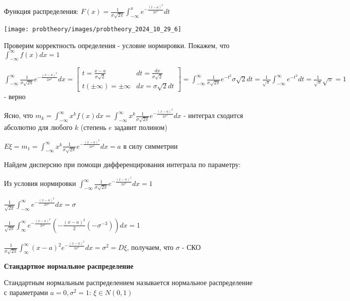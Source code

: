 \documentclass[12pt]{article}
\begin{document}
    Функция распределения: $F(x) = \frac{1}{\sigma \sqrt{2\pi}} \int_{-\infty}^x e^{-\frac{(t - a)^2}{2\sigma^2}} dt$

    \texttt{[image: probtheory/images/probtheory\_2024\_10\_29\_6]}

    Проверим корректность определения - условие нормировки. Покажем, что $\int_{-\infty}^\infty f(x)dx = 1$

    $\int_{-\infty}^\infty \frac{1}{\sigma \sqrt{2\pi}} e^{-\frac{(x - a)^2}{2\sigma^2}} dx = \left[\begin{matrix}t = \frac{x - a}{\sigma \sqrt{2}} & dt = \frac{dx}{\sigma\sqrt{2}} \\ t (\pm \infty) = \pm \infty & dx = \sigma\sqrt{2}dt\end{matrix}\right] = 
    \int_{-\infty}^\infty \frac{1}{\sigma\sqrt{2\pi}} e^{-t^2} \sigma\sqrt{2} dt = \frac{1}{\sqrt{\pi}} \int_{-\infty}^{\infty} e^{-t^2} dt = \frac{1}{\sqrt{\pi}} \sqrt{\pi} = 1$ - верно

    Ясно, что $m_k = \int_{-\infty}^\infty x^k f(x) dx = \int_{-\infty}^\infty x^k \frac{1}{\sigma \sqrt{2\pi}} e^{-\frac{(x - a)^2}{2\sigma^2}} dx$ - интеграл сходится абсолютно для любого $k$ (степень $e$ задавит полином)

    $E\xi = m_1 = \int_{-\infty}^\infty x^k \frac{1}{\sigma \sqrt{2\pi}} e^{-\frac{(x - a)^2}{2\sigma^2}} dx = a$ в силу симметрии

    Найдем дисперсию при помощи дифференцирования интеграла по параметру: 
    
    Из условия нормировки $\int_{-\infty}^\infty \frac{1}{\sigma \sqrt{2\pi}} e^{-\frac{(x - a)^2}{2\sigma^2}} dx = 1$

    $\frac{1}{\sqrt{2\pi}} \int_{-\infty}^\infty e^{-\frac{(x - a)^2}{2\sigma^2}} dx = \sigma$
    
    $\frac{1}{\sqrt{2\pi}} \int_{\infty}^\infty e^{-\frac{(x - a)^2}{2\sigma^2}} \left(-\frac{(x - a)^2}{2} (-\sigma^{-3})\right) dx = 1$
    
    $\frac{1}{\sigma\sqrt{2\pi}} \int_{\infty}^\infty (x - a)^2 e^{-\frac{(x - a)^2}{2\sigma^2}} dx = \sigma^2 = D\xi$, получаем, что $\sigma$ - СКО

    \mediumvspace

    \hypertarget{standardnormaldistribution}{}

    \textbf{Стандартное нормальное распределение}

    \Def Стандартным нормальным распределением называется нормальное распределение с параметрами $a = 0, \sigma^2 = 1$: $\xi \in N(0, 1)$
\end{document}

